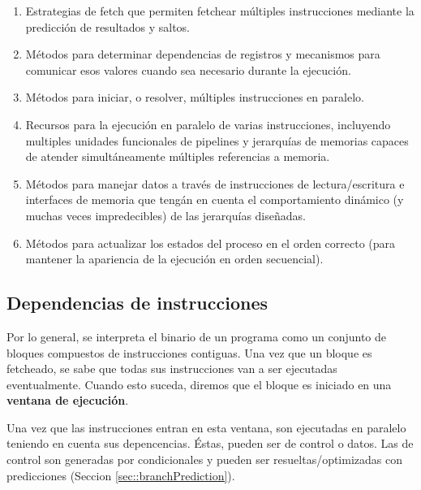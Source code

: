 \begin{enumerate}
	\item Estrategias de fetch que permiten fetchear múltiples instrucciones mediante la predicción de resultados y saltos.
	\item Métodos para determinar dependencias de registros y mecanismos para comunicar esos valores cuando sea necesario durante la ejecución.
	\item Métodos para iniciar, o resolver, múltiples instrucciones en paralelo.
	\item Recursos para la ejecución en paralelo de varias instrucciones, incluyendo multiples unidades funcionales de pipelines y jerarquías de memorias capaces de atender simultáneamente múltiples referencias a memoria.
	\item Métodos para manejar datos a través de instrucciones de lectura/escritura e interfaces de memoria que tengán en cuenta el comportamiento dinámico (y muchas veces impredecibles) de las jerarquías diseñadas.
	\item Métodos para actualizar los estados del proceso en el orden correcto (para mantener la apariencia de la ejecución en orden secuencial).
\end{enumerate}

\subsection{Dependencias de instrucciones}\label{sec:instructionLevelParalelism:dependenciaDeInstrucciones}
Por lo general, se interpreta el binario de un programa como un conjunto de bloques compuestos de instrucciones contiguas. Una vez que un bloque es fetcheado, se sabe que todas sus instrucciones van a ser ejecutadas eventualmente. Cuando esto suceda, diremos que el bloque es iniciado en una \textbf{ventana de ejecución}.

Una vez que las instrucciones entran en esta ventana, son ejecutadas en paralelo teniendo en cuenta sus depencencias. Éstas, pueden ser de control o datos. Las de control son generadas por condicionales y pueden ser resueltas/optimizadas con predicciones (Seccion \ref{sec::branchPrediction}). 

